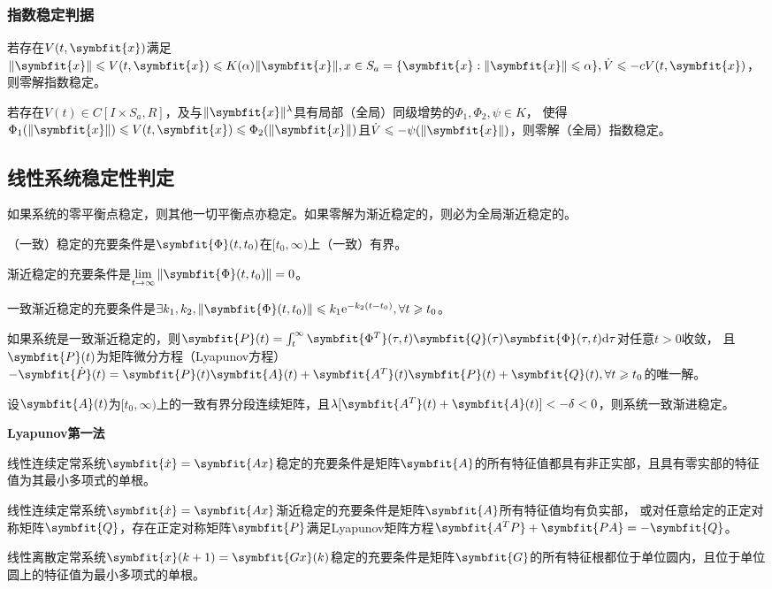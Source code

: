 \documentclass[11pt,a4paper]{ctexart}
\renewcommand{\d}{{\rm d}}
\newcommand{\e}{{\rm e}}
\newcommand{\bm}{\symbfit}
\begin{document}
        \subsubsection{指数稳定判据}
            若存在$V(t,\bm{x})$满足$\|\bm{x}\|\leqslant V(t,\bm{x})\leqslant K(\alpha)\|\bm{x}\|,x\in S_a=\{\bm{x}:\|\bm{x}\|\leqslant\alpha\},\dot{V}\leqslant-cV(t,\bm{x})$，则零解指数稳定。

            若存在$V(t)\in C[I\times S_a,R]$，及与$\|\bm{x}\|^\lambda$具有局部（全局）同级增势的$\Phi_1,\Phi_2,\psi\in K$，
            使得$\Phi_1(\|\bm{x}\|)\leqslant V(t,\bm{x})\leqslant\Phi_2(\|\bm{x}\|)$且$\dot V\leqslant-\psi(\|\bm{x}\|)$，则零解（全局）指数稳定。
    \subsection{线性系统稳定性判定}
        如果系统的零平衡点稳定，则其他一切平衡点亦稳定。如果零解为渐近稳定的，则必为全局渐近稳定的。
            
        （一致）稳定的充要条件是$\bm{\Phi}(t,t_0)$在$[t_0,\infty)$上（一致）有界。

        渐近稳定的充要条件是$\lim\limits_{t\rightarrow\infty}\|\bm{\Phi}(t,t_0)\|=0$。

        一致渐近稳定的充要条件是$\exists k_1,k_2,\|\bm{\Phi}(t,t_0)\|\leqslant k_1\e^{-k_2(t-t_0)},\forall t\geqslant t_0$。

        如果系统是一致渐近稳定的，则$\bm{P}(t)=\int_t^{\infty}\bm{\Phi^T}(\tau,t)\bm{Q}(\tau)\bm{\Phi}(\tau,t)\d\tau$对任意$t>0$收敛，
        且$\bm{P}(t)$为矩阵微分方程（Lyapunov方程）$-\bm{\dot P}(t)=\bm{P}(t)\bm{A}(t)+\bm{A^T}(t)\bm{P}(t)+\bm{Q}(t),\forall t\geqslant t_0$的唯一解。

        设$\bm{A}(t)$为$[t_0,\infty)$上的一致有界分段连续矩阵，且$\lambda[\bm{A^T}(t)+\bm{A}(t)]<-\delta<0$，则系统一致渐进稳定。

        {\setlength{\parindent}{0pt}\textbf{Lyapunov第一法}}

        线性连续定常系统$\bm{\dot x}=\bm{Ax}$稳定的充要条件是矩阵$\bm{A}$的所有特征值都具有非正实部，且具有零实部的特征值为其最小多项式的单根。
        
        线性连续定常系统$\bm{\dot x}=\bm{Ax}$渐近稳定的充要条件是矩阵$\bm{A}$所有特征值均有负实部，
        或对任意给定的正定对称矩阵$\bm{Q}$，存在正定对称矩阵$\bm{P}$满足Lyapunov矩阵方程$\bm{A^T P}+\bm{PA}=-\bm{Q}$。

        线性离散定常系统$\bm{x}(k+1)=\bm{Gx}(k)$稳定的充要条件是矩阵$\bm{G}$的所有特征根都位于单位圆内，且位于单位圆上的特征值为最小多项式的单根。
\end{document}
